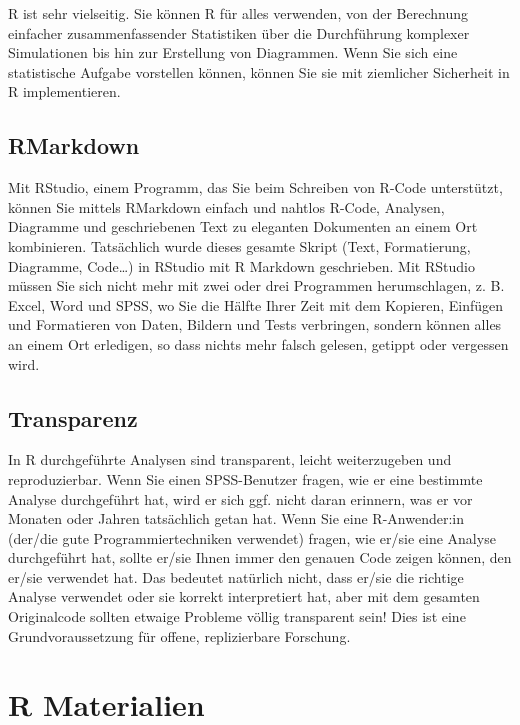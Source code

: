 \documentclass[
]{book}
\begin{document}
R ist sehr vielseitig. Sie können R für alles verwenden, von der Berechnung einfacher zusammenfassender Statistiken über die Durchführung komplexer Simulationen bis hin zur Erstellung von Diagrammen. Wenn Sie sich eine statistische Aufgabe vorstellen können, können Sie sie mit ziemlicher Sicherheit in R implementieren.

\hypertarget{rmarkdown}{%
\section{RMarkdown}\label{rmarkdown}}

Mit RStudio, einem Programm, das Sie beim Schreiben von R-Code unterstützt, können Sie mittels RMarkdown einfach und nahtlos R-Code, Analysen, Diagramme und geschriebenen Text zu eleganten Dokumenten an einem Ort kombinieren. Tatsächlich wurde dieses gesamte Skript (Text, Formatierung, Diagramme, Code\ldots) in RStudio mit R Markdown geschrieben. Mit RStudio müssen Sie sich nicht mehr mit zwei oder drei Programmen herumschlagen, z. B. Excel, Word und SPSS, wo Sie die Hälfte Ihrer Zeit mit dem Kopieren, Einfügen und Formatieren von Daten, Bildern und Tests verbringen, sondern können alles an einem Ort erledigen, so dass nichts mehr falsch gelesen, getippt oder vergessen wird.

\hypertarget{transparenz}{%
\section{Transparenz}\label{transparenz}}

In R durchgeführte Analysen sind transparent, leicht weiterzugeben und reproduzierbar. Wenn Sie einen SPSS-Benutzer fragen, wie er eine bestimmte Analyse durchgeführt hat, wird er sich ggf. nicht daran erinnern, was er vor Monaten oder Jahren tatsächlich getan hat. Wenn Sie eine R-Anwender:in (der/die gute Programmiertechniken verwendet) fragen, wie er/sie eine Analyse durchgeführt hat, sollte er/sie Ihnen immer den genauen Code zeigen können, den er/sie verwendet hat. Das bedeutet natürlich nicht, dass er/sie die richtige Analyse verwendet oder sie korrekt interpretiert hat, aber mit dem gesamten Originalcode sollten etwaige Probleme völlig transparent sein! Dies ist eine Grundvoraussetzung für offene, replizierbare Forschung.

\hypertarget{r-materialien}{%
\chapter{R Materialien}\label{r-materialien}}
\end{document}
